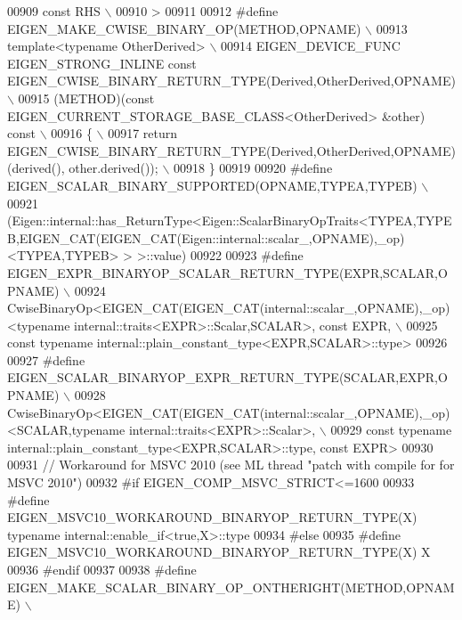 \begin{DoxyCode}
00909 \textcolor{preprocessor}{      const RHS \(\backslash\)}
00910 \textcolor{preprocessor}{    >}
00911 
00912 \textcolor{preprocessor}{#define EIGEN\_MAKE\_CWISE\_BINARY\_OP(METHOD,OPNAME) \(\backslash\)}
00913 \textcolor{preprocessor}{  template<typename OtherDerived> \(\backslash\)}
00914 \textcolor{preprocessor}{  EIGEN\_DEVICE\_FUNC EIGEN\_STRONG\_INLINE const EIGEN\_CWISE\_BINARY\_RETURN\_TYPE(Derived,OtherDerived,OPNAME) \(\backslash\)}
00915 \textcolor{preprocessor}{  (METHOD)(const EIGEN\_CURRENT\_STORAGE\_BASE\_CLASS<OtherDerived> &other) const \(\backslash\)}
00916 \textcolor{preprocessor}{  \{ \(\backslash\)}
00917 \textcolor{preprocessor}{    return EIGEN\_CWISE\_BINARY\_RETURN\_TYPE(Derived,OtherDerived,OPNAME)(derived(), other.derived()); \(\backslash\)}
00918 \textcolor{preprocessor}{  \}}
00919 
00920 \textcolor{preprocessor}{#define EIGEN\_SCALAR\_BINARY\_SUPPORTED(OPNAME,TYPEA,TYPEB) \(\backslash\)}
00921 \textcolor{preprocessor}{ 
       (Eigen::internal::has\_ReturnType<Eigen::ScalarBinaryOpTraits<TYPEA,TYPEB,EIGEN\_CAT(EIGEN\_CAT(Eigen::internal::scalar\_,OPNAME),\_op)<TYPEA,TYPEB>  > >::value)}
00922 
00923 \textcolor{preprocessor}{#define EIGEN\_EXPR\_BINARYOP\_SCALAR\_RETURN\_TYPE(EXPR,SCALAR,OPNAME) \(\backslash\)}
00924 \textcolor{preprocessor}{  CwiseBinaryOp<EIGEN\_CAT(EIGEN\_CAT(internal::scalar\_,OPNAME),\_op)<typename
       internal::traits<EXPR>::Scalar,SCALAR>, const EXPR, \(\backslash\)}
00925 \textcolor{preprocessor}{                const typename internal::plain\_constant\_type<EXPR,SCALAR>::type>}
00926 
00927 \textcolor{preprocessor}{#define EIGEN\_SCALAR\_BINARYOP\_EXPR\_RETURN\_TYPE(SCALAR,EXPR,OPNAME) \(\backslash\)}
00928 \textcolor{preprocessor}{  CwiseBinaryOp<EIGEN\_CAT(EIGEN\_CAT(internal::scalar\_,OPNAME),\_op)<SCALAR,typename
       internal::traits<EXPR>::Scalar>, \(\backslash\)}
00929 \textcolor{preprocessor}{                const typename internal::plain\_constant\_type<EXPR,SCALAR>::type, const EXPR>}
00930 
00931 \textcolor{comment}{// Workaround for MSVC 2010 (see ML thread "patch with compile for for MSVC 2010")}
00932 \textcolor{preprocessor}{#if EIGEN\_COMP\_MSVC\_STRICT<=1600}
00933 \textcolor{preprocessor}{#define EIGEN\_MSVC10\_WORKAROUND\_BINARYOP\_RETURN\_TYPE(X) typename internal::enable\_if<true,X>::type}
00934 \textcolor{preprocessor}{#else}
00935 \textcolor{preprocessor}{#define EIGEN\_MSVC10\_WORKAROUND\_BINARYOP\_RETURN\_TYPE(X) X}
00936 \textcolor{preprocessor}{#endif}
00937 
00938 \textcolor{preprocessor}{#define EIGEN\_MAKE\_SCALAR\_BINARY\_OP\_ONTHERIGHT(METHOD,OPNAME) \(\backslash\)}

\end{DoxyCode}
